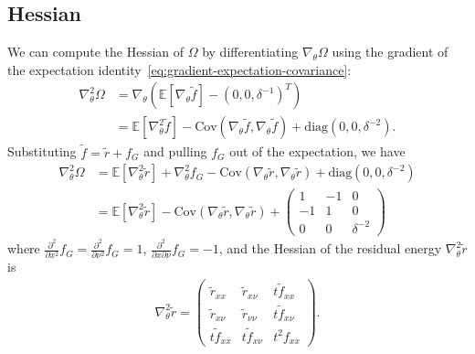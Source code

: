 \documentclass{article}
\begin{document}
\subsection{Hessian}

We can compute the Hessian of $\Omega$ by differentiating $\nabla_{\theta} \Omega$ using the gradient of the expectation identity~\eqref{eq:gradient-expectation-covariance}:
%
\begin{align}
  \nabla_{\theta}^2 \Omega & = \nabla_\theta \left( \mathbb{E}[\nabla_{\theta} \tilde{f}] - (0, 0, \delta^{-1})^T \right)                                                       \\
                           & = \mathbb{E}[\nabla_{\theta}^2 \tilde{f}] - \mathrm{Cov}(\nabla_{\theta} \tilde{f}, \nabla_{\theta} \tilde{f}) + \mathrm{diag}(0, 0, \delta^{-2}).
\end{align}
%
Substituting $\tilde{f} = \tilde{r} + f_G$ and pulling $f_G$ out of the expectation, we have
%
\begin{align}
  \nabla_{\theta}^2 \Omega
   & = \mathbb{E}[\nabla_{\theta}^2 \tilde{r}] + \nabla_{\theta}^2 f_G - \mathrm{Cov}(\nabla_{\theta} \tilde{r}, \nabla_{\theta} \tilde{r}) + \mathrm{diag}(0, 0, \delta^{-2}) \\
   & = \mathbb{E}[\nabla_{\theta}^2 \tilde{r}] - \mathrm{Cov}(\nabla_{\theta} \tilde{r}, \nabla_{\theta} \tilde{r}) + \begin{pmatrix} 1 & -1 & 0 \\ -1 & 1 & 0 \\ 0 & 0 & \delta^{-2} \end{pmatrix}
\end{align}
%
where $\frac{\partial^2}{\partial x^2} f_G = \frac{\partial^2}{\partial \nu^2} f_G = 1$, $\frac{\partial^2}{\partial x \partial \nu} f_G = -1$, and the Hessian of the residual energy $\nabla_{\theta}^2 \tilde{r}$ is
%
\begin{align}
  \nabla_{\theta}^2 \tilde{r} = \begin{pmatrix} \tilde{r}_{xx} & \tilde{r}_{x\nu} & t \tilde{f}_{xx} \\ \tilde{r}_{x\nu} & \tilde{r}_{\nu\nu} & t \tilde{f}_{x\nu} \\ t \tilde{f}_{xx} & t \tilde{f}_{x\nu} & t^2 f_{xx} \end{pmatrix}.
\end{align}
\end{document}
